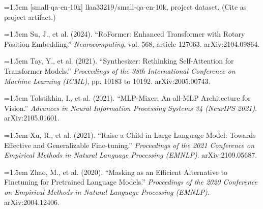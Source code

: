 \documentclass[11pt]{article}
\begin{document}
\par\hangindent=1.5em [small-qa-en-10k] llaa33219/small-qa-en-10k, project dataset. (Cite as project artifact.)

\par\hangindent=1.5em Su, J., et al. (2024). ``RoFormer: Enhanced Transformer with Rotary Position Embedding.'' \emph{Neurocomputing}, vol. 568, article 127063. arXiv:2104.09864.

\par\hangindent=1.5em Tay, Y., et al. (2021). ``Synthesizer: Rethinking Self-Attention for Transformer Models.'' \emph{Proceedings of the 38th International Conference on Machine Learning (ICML)}, pp. 10183 to 10192. arXiv:2005.00743.

\par\hangindent=1.5em Tolstikhin, I., et al. (2021). ``MLP-Mixer: An all-MLP Architecture for Vision.'' \emph{Advances in Neural Information Processing Systems 34 (NeurIPS 2021)}. arXiv:2105.01601.

\par\hangindent=1.5em Xu, R., et al. (2021). ``Raise a Child in Large Language Model: Towards Effective and Generalizable Fine-tuning.'' \emph{Proceedings of the 2021 Conference on Empirical Methods in Natural Language Processing (EMNLP)}. arXiv:2109.05687.

\par\hangindent=1.5em Zhao, M., et al. (2020). ``Masking as an Efficient Alternative to Finetuning for Pretrained Language Models.'' \emph{Proceedings of the 2020 Conference on Empirical Methods in Natural Language Processing (EMNLP)}. arXiv:2004.12406.
\end{document}
